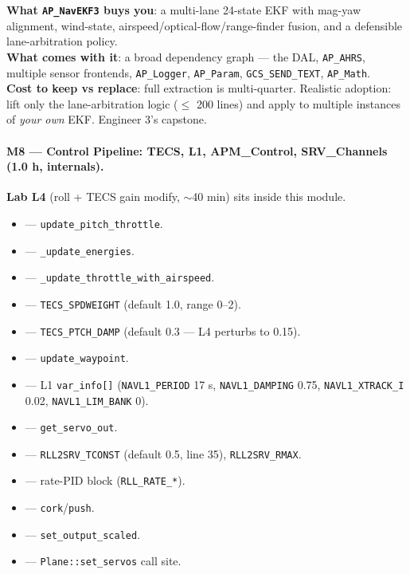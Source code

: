 \documentclass[a4paper,11pt,twoside]{article}
\renewcommand{\adoptionsidebar}[1]{\begin{tcolorbox}[colback=cyan!4!white,colframe=cyan!50!black,title=Adoption side-bar,breakable]#1\end{tcolorbox}}
\begin{document}
\adoptionsidebar{
\textbf{What \texttt{AP\_NavEKF3} buys you}: a multi-lane 24-state EKF with mag-yaw alignment, wind-state, airspeed/optical-flow/range-finder fusion, and a defensible lane-arbitration policy.\\
\textbf{What comes with it}: a broad dependency graph --- the DAL, \texttt{AP\_AHRS}, multiple sensor frontends, \texttt{AP\_Logger}, \texttt{AP\_Param}, \texttt{GCS\_SEND\_TEXT}, \texttt{AP\_Math}.\\
\textbf{Cost to keep vs replace}: full extraction is multi-quarter. Realistic adoption: lift only the lane-arbitration logic ($\leq$ 200 lines) and apply to multiple instances of \emph{your own} EKF. Engineer 3's capstone.}

\paragraph{M8 --- Control Pipeline: TECS, L1, APM\_Control, SRV\_Channels (1.0 h, internals).}
\textbf{Lab L4} (roll + TECS gain modify, $\sim$40 min) sits inside this module.
\begin{itemize}
  \item {} --- \texttt{update\_pitch\_throttle}.
  \item {} --- \texttt{\_update\_energies}.
  \item {} --- \texttt{\_update\_throttle\_with\_airspeed}.
  \item {} --- \texttt{TECS\_SPDWEIGHT} (default 1.0, range 0--2).
  \item {} --- \texttt{TECS\_PTCH\_DAMP} (default 0.3 --- L4 perturbs to 0.15).
  \item {} --- \texttt{update\_waypoint}.
  \item {} --- L1 \texttt{var\_info[]} (\texttt{NAVL1\_PERIOD} 17 s, \texttt{NAVL1\_DAMPING} 0.75, \texttt{NAVL1\_XTRACK\_I} 0.02, \texttt{NAVL1\_LIM\_BANK} 0).
  \item {} --- \texttt{get\_servo\_out}.
  \item {} --- \texttt{RLL2SRV\_TCONST} (default 0.5, line 35), \texttt{RLL2SRV\_RMAX}.
  \item {} --- rate-PID block (\texttt{RLL\_RATE\_*}).
  \item {} --- \texttt{cork}/\texttt{push}.
  \item {} --- \texttt{set\_output\_scaled}.
  \item {} --- \texttt{Plane::set\_servos} call site.
\end{itemize}
\end{document}
